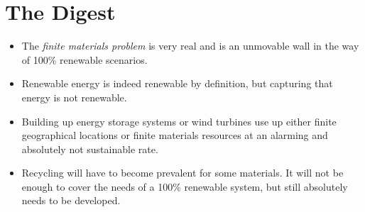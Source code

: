 \blindtext



\section{The Digest}

\begin{kaoboxgreen}[frametitle=Main Takeaways]

\begin{itemize}
\item The \emph{finite materials problem} is very real and is an unmovable wall in the way of 100\% renewable scenarios.
\item Renewable energy is indeed renewable by definition, but capturing that energy is not renewable.
\item Building up energy storage systems or wind turbines use up either finite geographical locations or finite materials resources at an alarming and absolutely not sustainable rate.
\item Recycling will have to become prevalent for some materials. It will not be enough to cover the needs of a 100\% renewable system, but still absolutely needs to be developed.
\end{itemize}
  
\end{kaoboxgreen}